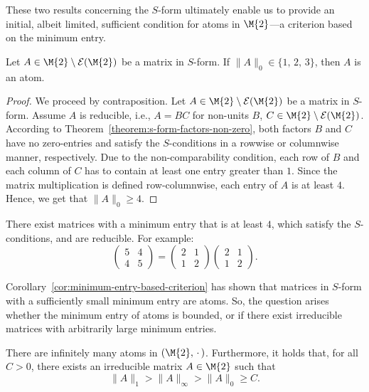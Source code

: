 These two results concerning the $S$-form ultimately enable us to provide an initial, albeit limited, sufficient condition for atoms in $\M{2}$—a criterion based on the minimum entry.

\begin{corollary}\label{cor:minimum-entry-based-criterion}
Let $A \in \M{2}\setminus\mathcal{E}(\M{2})$ be a matrix in $S$-form. If $\| A\|_0 \in  \{ 1,\,2,\,3 \}$, then $A$ is an atom.
\end{corollary}

\begin{proof}
We proceed by contraposition. Let $A \in \M{2}\setminus\mathcal{E}(\M{2})$ be a matrix in $S$-form. Assume $A$ is reducible, i.e., $A =BC$ for non-units $B$, $C \in \M{2}\setminus \mathcal{E}(\M{2})$. According to Theorem~\ref{theorem:s-form-factors-non-zero}, both factors $B$ and $C$ have no zero-entries and satisfy the $S$-conditions in a rowwise or columnwise manner, respectively. Due to the non-comparability condition, each row of $B$ and each column of $C$ has to contain at least one entry greater than $1$. Since the matrix multiplication is defined row-columnwise, each entry of $A$ is at least $4$. Hence, we get that $\| A\|_0 \geq 4$.
\end{proof}

\begin{remark*}
There exist matrices with a minimum entry that is at least $4$, which satisfy the $S$-conditions, and are reducible. For example:
\[ \begin{pmatrix} 5 & 4 \\ 4 & 5 \end{pmatrix} =  \begin{pmatrix} 2 & 1 \\ 1 & 2 \end{pmatrix} \begin{pmatrix} 2 & 1 \\ 1 & 2 \end{pmatrix}. \]
\end{remark*}

Corollary~\ref{cor:minimum-entry-based-criterion} has shown that matrices in $S$-form with a sufficiently small minimum entry are atoms. So, the question arises whether the minimum entry of atoms is bounded, or if there exist irreducible matrices with arbitrarily large minimum entries.

\begin{proposition}\label{prop:euclid}
There are infinitely many atoms in $(\M{2}, \,\cdot\,)$. 	Furthermore, it holds that, for all $C > 0$, there exists an irreducible matrix $A \in \M{2}$ such that
\[ \| A \|_1 > \| A \|_{\infty} > \| A \|_0 \geq C. \]
\end{proposition}

